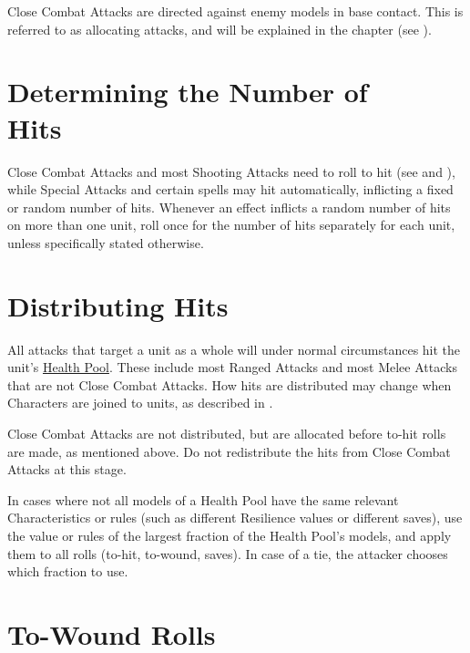 Close Combat Attacks are directed against enemy models in base contact. This is referred to as allocating attacks, and will be explained in the  chapter (see ).

\section[Determining the Number of Hits]{Determining the Number of\\ Hits}
\label{determining_the_number_of_hits}

Close Combat Attacks and most Shooting Attacks need to roll to hit (see  and ), while Special Attacks and certain spells may hit automatically, inflicting a fixed or random number of hits.
Whenever an effect inflicts a random number of hits on more than one unit, roll once for the number of hits separately for each unit, unless specifically stated otherwise.

\columnbreak

\section{Distributing Hits}
\label{distributing_hits}

All attacks that target a unit as a whole will under normal circumstances hit the unit's \rnf{} \hyperref[health_pools]{Health Pool}. These include most Ranged Attacks and most Melee Attacks that are not Close Combat Attacks. How hits are distributed may change when Characters are joined to units, as described in .

Close Combat Attacks are not distributed, but are allocated before to-hit rolls are made, as mentioned above. Do not redistribute the hits from Close Combat Attacks at this stage.

In cases where not all models of a Health Pool have the same relevant Characteristics or rules (such as different Resilience values or different saves), use the value or rules of the largest fraction of the Health Pool's models, and apply them to all rolls (to-hit, to-wound, saves). In case of a tie, the attacker chooses which fraction to use.

\section{To-Wound Rolls}
\label{to_wound_rolls}

